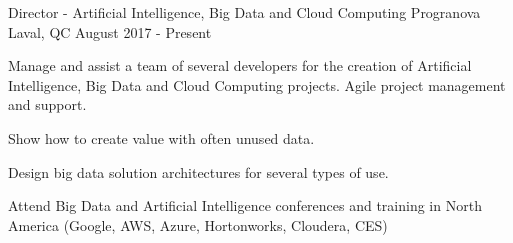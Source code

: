 \begin{cventries}
  \cventry
    {Director - Artificial Intelligence, Big Data and Cloud Computing}
    {Progranova}
    {Laval, QC}
    {August 2017 - Present}
    {
      \begin{cvitems}
        \item {Manage and assist a team of several developers for the creation of Artificial Intelligence, Big Data and Cloud Computing projects. Agile project management and support.}
        \item {Show how to create value with often unused data.}
        \item {Design big data solution architectures for several types of use.}
		\item {Attend Big Data and Artificial Intelligence conferences and training in North America (Google, AWS, Azure, Hortonworks, Cloudera, CES)}
      \end{cvitems}
    }
	

\end{cventries}
